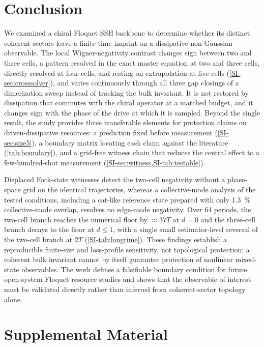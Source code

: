 \documentclass[aps,pra,preprint,superscriptaddress,amsmath,amssymb]{revtex4-2}
\begin{document}
\section{Conclusion}
\label{sec:conclusion}

We examined a chiral Floquet SSH backbone to determine whether its distinct coherent sectors leave a finite-time imprint on a dissipative non-Gaussian observable. The local Wigner-negativity contrast changes sign between two and three cells, a pattern resolved in the exact master equation at two and three cells, directly resolved at four cells, and resting on extrapolation at five cells (\cref{SI-sec:crosssolver}), and varies continuously through all three gap closings of a dimerization sweep instead of tracking the bulk invariant. It is not restored by dissipation that commutes with the chiral operator at a matched budget, and it changes sign with the phase of the drive at which it is sampled. Beyond the single result, the study provides three transferable elements for protection claims on driven-dissipative resources: a prediction fixed before measurement (\cref{SI-sec:size5}), a boundary matrix locating each claim against the literature (\cref{tab:boundary}), and a grid-free witness chain that reduces the central effect to a few-hundred-shot measurement (\cref{SI-sec:witness,SI-tab:testable}).

Displaced Fock-state witnesses detect the two-cell negativity without a phase-space grid on the identical trajectories, whereas a collective-mode analysis of the tested conditions, including a cat-like reference state prepared with only \qty{1.3}{\percent} collective-mode overlap, resolves no edge-mode negativity. Over \num{64} periods, the two-cell branch reaches the numerical floor by ${\approx}\num{37}T$ at $d=\num{0}$ and the three-cell branch decays to the floor at $d\le\num{1}$, with a single small estimator-level reversal of the two-cell branch at \num{2}$T$ (\cref{SI-tab:longtime}). These findings establish a reproducible finite-size and loss-profile sensitivity, not topological protection: a coherent bulk invariant cannot by itself guarantee protection of nonlinear mixed-state observables. The work defines a falsifiable boundary condition for future open-system Floquet resource studies and shows that the observable of interest must be validated directly rather than inferred from coherent-sector topology alone.

\section*{Supplemental Material}
\end{document}
